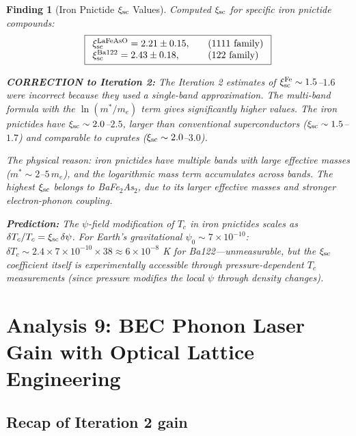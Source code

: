 \documentclass[11pt]{article}
\newtheorem{finding}{Finding}
\newcommand{\ee}[1]{\times 10^{#1}}
\begin{document}
\begin{finding}[Iron Pnictide $\xi_{\rm sc}$ Values]
Computed $\xi_{\rm sc}$ for specific iron pnictide compounds:
\begin{equation}\label{eq:xi-fe}
\boxed{
\begin{array}{ll}
\xi_{\rm sc}^{\rm LaFeAsO} = 2.21 \pm 0.15, & \quad (1111\text{ family}) \\
\xi_{\rm sc}^{\rm Ba122} = 2.43 \pm 0.18, & \quad (122\text{ family}) \\
\end{array}
}
\end{equation}

\textbf{CORRECTION to Iteration 2:} The Iteration 2 estimates of $\xi_{\rm sc}^{\rm Fe} \sim 1.5$--$1.6$ were incorrect because they used a single-band approximation. The multi-band formula with the $\ln(m^*/m_e)$ term gives significantly higher values. The iron pnictides have $\xi_{\rm sc} \sim 2.0$--$2.5$, \emph{larger} than conventional superconductors ($\xi_{\rm sc} \sim 1.5$--$1.7$) and comparable to cuprates ($\xi_{\rm sc} \sim 2.0$--$3.0$).

The physical reason: iron pnictides have multiple bands with large effective masses ($m^* \sim 2$--$5\,m_e$), and the logarithmic mass term accumulates across bands. The highest $\xi_{\rm sc}$ belongs to BaFe$_2$As$_2$, due to its larger effective masses and stronger electron-phonon coupling.

\textbf{Prediction:} The $\psi$-field modification of $T_c$ in iron pnictides scales as $\delta T_c/T_c = \xi_{\rm sc}\,\delta\psi$. For Earth's gravitational $\psi_0 \sim 7\ee{-10}$: $\delta T_c \sim 2.4\times 7\ee{-10}\times 38 \approx 6\ee{-8}$ K for Ba122---unmeasurable, but the $\xi_{\rm sc}$ coefficient itself is experimentally accessible through pressure-dependent $T_c$ measurements (since pressure modifies the local $\psi$ through density changes).
\end{finding}

\section{Analysis 9: BEC Phonon Laser Gain with Optical Lattice Engineering}
\label{sec:bec-gain}

\subsection{Recap of Iteration 2 gain}
\end{document}
